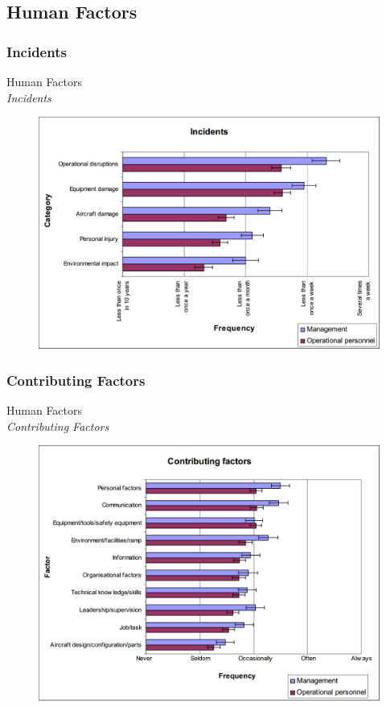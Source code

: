 \subsection{Human Factors}

\subsubsection{Incidents}
\begin{frame}{Human Factors\\\textit{Incidents}}{}
	\begin{figure}[H]
	\centering
	\includegraphics[width=\textwidth]{Grafik/FrequencyOfIncidents}
\end{figure}
\end{frame}

\subsubsection{Contributing Factors}
\begin{frame}{Human Factors\\\textit{Contributing Factors}}{}
	\begin{figure}[H]
	\centering
	\includegraphics[width=\textwidth]{Grafik/ContributingFactors}
\end{figure}
\end{frame}

